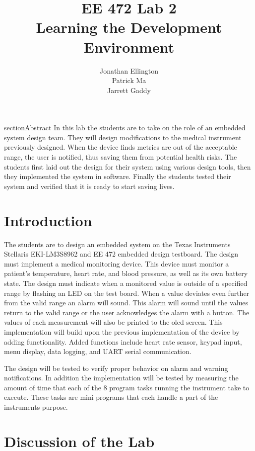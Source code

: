 \documentclass[12pt]{article} %
\title{\TitleFont EE 472 Lab 2 \\ Learning the Development Environment \vfill }
\author{\AuthorFont Jonathan Ellington \\ Patrick Ma \\ Jarrett Gaddy}
\date{}
\begin{document}
\maketitle
\thispagestyle{empty}
\pagebreak
\tableofcontents
\listoftables
\listoffigures
\thispagestyle{empty}
\pagebreak
\setcounter{page}{1}


section{Abstract} In this lab the students are to take on the role of an
embedded system design team. They will design modifications to the medical
instrument previously designed. When the device finds metrics
are out of the acceptable range, the user is notified, thus saving them
from potential health risks. The students first laid out the design for
their system using various design tools, then they implemented the system in
software. Finally the students tested their system and verified that it is
ready to start saving lives. 

\section{Introduction}
The students are to design an embedded system on the Texas Instruments
Stellaris EKI-LM3S8962 and EE 472 embedded design testboard. The design must
implement a medical monitoring device. This device must monitor a patient's
temperature, heart rate, and blood pressure, as well as its own battery state.
The design must indicate when a monitored value is outside of a specified range
by flashing an LED on the test board. When a value deviates even further from
the valid range an alarm will sound. This alarm will sound until the values
return to the valid range or the user acknowledges the alarm with a button. The
values of each measurement will also be printed to the oled screen. This implementation will build upon the previous implementation of the device by adding functionality. Added functions include heart rate sensor, keypad input, menu display, data logging, and UART serial communication.

The design will be tested to verify proper behavior on alarm and warning notifications. In addition the implementation will be tested by measuring the amount of time that each of the 8 program tasks running the instrument take to execute. These tasks are mini programs that each handle a part of the instruments purpose.

\section{Discussion of the Lab}
\end{document}
